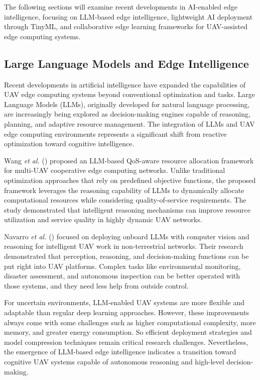 \documentclass[a4paper, 12pt]{article}
\begin{document}
The following sections will examine recent developments in AI-enabled edge intelligence, focusing on LLM-based edge intelligence, lightweight AI deployment through TinyML, and collaborative edge learning frameworks for UAV-assisted edge computing systems.

\subsection*{Large Language Models and Edge Intelligence}
Recent developments in artificial intelligence have expanded the capabilities of UAV edge computing systems beyond conventional optimization and tasks. Large Language Models (LLMs), originally developed for natural language processing, are increasingly being explored as decision-making engines capable of reasoning, planning, and adaptive resource management. The integration of LLMs and UAV edge computing environments represents a significant shift from reactive optimization toward cognitive intelligence.

Wang \textit{et al.} (\cite{Wang2026LLM}) proposed an LLM-based QoS-aware resource allocation framework for multi-UAV cooperative edge computing networks. Unlike traditional optimization approaches that rely on predefined objective functions, the proposed framework leverages the reasoning capability of LLMs to dynamically allocate computational resources while considering quality-of-service requirements. The study demonstrated that intelligent reasoning mechanisms can improve resource utilization and service quality in highly dynamic UAV networks.

Navarro \textit{et al.} (\cite{Navarro2025}) focused on deploying onboard LLMs with computer vision and reasoning for intelligent UAV work in non-terrestrial networks. Their research demonstrated that perception, reasoning, and decision-making functions can be put right into UAV platforms. Complex tasks like environmental monitoring, disaster assessment, and autonomous inspection can be better operated with those systems, and they need less help from outside control.

For uncertain environments, LLM-enabled UAV systems are more flexible and adaptable than regular deep learning approaches. However, these improvements always come with some challenges such as higher computational complexity, more memory, and greater energy consumption. So efficient deployment strategies and model compression techniques remain critical research challenges. Nevertheless, the emergence of LLM-based edge intelligence indicates a transition toward cognitive UAV systems capable of autonomous reasoning and high-level decision-making.
\end{document}
